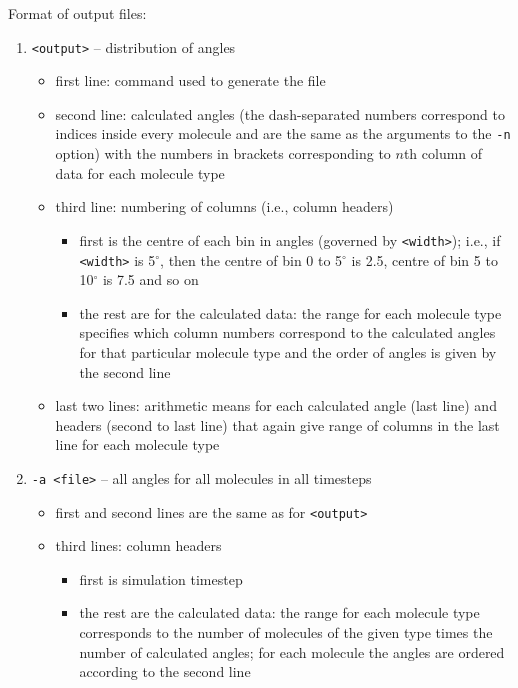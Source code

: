 \noindent
Format of output files:
\begin{enumerate}[nosep,leftmargin=20pt]
  \item \texttt{<output>} -- distribution of angles
    \begin{itemize}[nosep,leftmargin=5pt]
      \item first line: command used to generate the file
      \item second line: calculated angles (the dash-separated numbers
        correspond to indices inside every molecule and are the same as the
        arguments to the \texttt{-n} option) with the numbers in brackets
        corresponding to $n$th column of data for each molecule type
      \item third line: numbering of columns (i.e., column headers)
        \begin{itemize}[nosep,leftmargin=10pt]
          \item first is the centre of each bin in angles (governed by
            \texttt{<width>}); i.e., if \texttt{<width>} is 5$^{\circ}$,
            then the centre of bin 0 to 5$^{\circ}$ is 2.5, centre of bin 5
            to 10$^{\circ}$ is 7.5 and so on
          \item the rest are for the calculated data: the range for each
            molecule type specifies which column numbers correspond to the
            calculated angles for that particular molecule type and the
            order of angles is given by the second line
        \end{itemize}
      \item last two lines: arithmetic means for each calculated angle
        (last line) and headers (second to last line) that again give range
        of columns in the last line for each molecule type
    \end{itemize}
  \item \texttt{-a <file>} -- all angles for all molecules in all timesteps
  \begin{itemize}[nosep,leftmargin=5pt]
    \item first and second lines are the same as for \texttt{<output>}
    \item third lines: column headers
      \begin{itemize}[nosep,leftmargin=10pt]
        \item first is simulation timestep
        \item the rest are the calculated data: the range for each molecule
          type corresponds to the number of molecules of the given type
          times the number of calculated angles; for each molecule the
          angles are ordered according to the second line
      \end{itemize}
  \end{itemize}
\end{enumerate}
